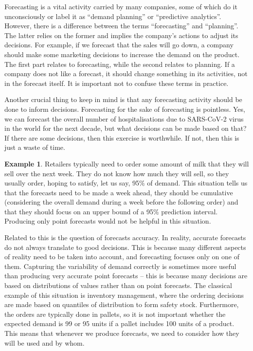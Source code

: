 \documentclass[
]{book}
\theoremstyle{definition}
\theoremstyle{definition}
\newtheorem{example}{Example}[chapter]
\theoremstyle{definition}
\theoremstyle{definition}
\theoremstyle{remark}
\begin{document}
Forecasting is a vital activity carried by many companies, some of which do it unconsciously or label it as ``demand planning'' or ``predictive analytics''. However, there is a difference between the terms ``forecasting'' and ``planning''. The latter relies on the former and implies the company's actions to adjust its decisions. For example, if we forecast that the sales will go down, a company should make some marketing decisions to increase the demand on the product. The first part relates to forecasting, while the second relates to planning. If a company does not like a forecast, it should change something in its activities, not in the forecast itself. It is important not to confuse these terms in practice.

Another crucial thing to keep in mind is that any forecasting activity should be done to inform decisions. Forecasting for the sake of forecasting is pointless. Yes, we can forecast the overall number of hospitalisations due to SARS-CoV-2 virus in the world for the next decade, but what decisions can be made based on that? If there are some decisions, then this exercise is worthwhile. If not, then this is just a waste of time.

\begin{example}
Retailers typically need to order some amount of milk that they will sell over the next week. They do not know how much they will sell, so they usually order, hoping to satisfy, let us say, 95\% of demand. This situation tells us that the forecasts need to be made a week ahead, they should be cumulative (considering the overall demand during a week before the following order) and that they should focus on an upper bound of a 95\% prediction interval. Producing only point forecasts would not be helpful in this situation.
\end{example}

Related to this is the question of forecasts accuracy. In reality, accurate forecasts do not always translate to good decisions. This is because many different aspects of reality need to be taken into account, and forecasting focuses only on one of them. Capturing the variability of demand correctly is sometimes more useful than producing very accurate point forecasts -- this is because many decisions are based on distributions of values rather than on point forecasts. The classical example of this situation is inventory management, where the ordering decisions are made based on quantiles of distribution to form safety stock. Furthermore, the orders are typically done in pallets, so it is not important whether the expected demand is 99 or 95 units if a pallet includes 100 units of a product. This means that whenever we produce forecasts, we need to consider how they will be used and by whom.
\end{document}
